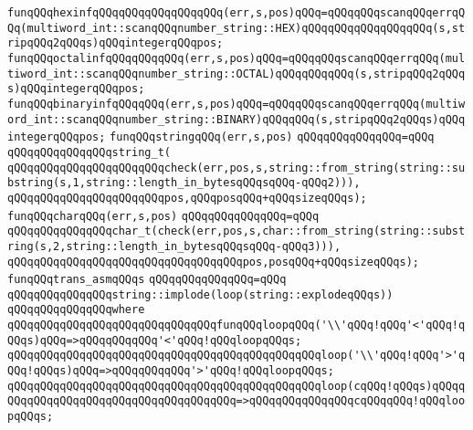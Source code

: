 \verb|funqQQqhexinfqQQqqQQqqQQqqQQqqQQq(err,s,pos)qQQq=qQQqqQQqscanqQQqerrqQQq(multiword_int::scanqQQqnumber_string::HEX)qQQqqQQqqQQqqQQqqQQq(s,stripqQQq2qQQqs)qQQqintegerqQQqpos;|\newline
\verb|funqQQqoctalinfqQQqqQQqqQQq(err,s,pos)qQQq=qQQqqQQqscanqQQqerrqQQq(multiword_int::scanqQQqnumber_string::OCTAL)qQQqqQQqqQQq(s,stripqQQq2qQQqs)qQQqintegerqQQqpos;|\newline
\verb|funqQQqbinaryinfqQQqqQQq(err,s,pos)qQQq=qQQqqQQqscanqQQqerrqQQq(multiword_int::scanqQQqnumber_string::BINARY)qQQqqQQq(s,stripqQQq2qQQqs)qQQqintegerqQQqpos;|\newline
\newline
\verb|funqQQqstringqQQq(err,s,pos)|\newline
\verb|qQQqqQQqqQQqqQQq=qQQq|\newline
\verb|qQQqqQQqqQQqqQQqstring_t(|\newline
\verb|qQQqqQQqqQQqqQQqqQQqqQQqcheck(err,pos,s,string::from_string(string::substring(s,1,string::length_in_bytesqQQqsqQQq-qQQq2))),|\newline
\verb|qQQqqQQqqQQqqQQqqQQqqQQqpos,qQQqposqQQq+qQQqsizeqQQqs);|\newline
\newline
\verb|funqQQqcharqQQq(err,s,pos)|\newline
\verb|qQQqqQQqqQQqqQQq=qQQq|\newline
\verb|qQQqqQQqqQQqqQQqchar_t(check(err,pos,s,char::from_string(string::substring(s,2,string::length_in_bytesqQQqsqQQq-qQQq3))),|\newline
\verb|qQQqqQQqqQQqqQQqqQQqqQQqqQQqqQQqqQQqpos,posqQQq+qQQqsizeqQQqs);|\newline
\newline
\verb|funqQQqtrans_asmqQQqs|\newline
\verb|qQQqqQQqqQQqqQQq=qQQq|\newline
\verb|qQQqqQQqqQQqqQQqstring::implode(loop(string::explodeqQQqs))|\newline
\verb|qQQqqQQqqQQqqQQqwhere|\newline
\verb|qQQqqQQqqQQqqQQqqQQqqQQqqQQqqQQqfunqQQqloopqQQq('\\'qQQq!qQQq'<'qQQq!qQQqs)qQQq=>qQQqqQQqqQQq'<'qQQq!qQQqloopqQQqs;|\newline
\verb|qQQqqQQqqQQqqQQqqQQqqQQqqQQqqQQqqQQqqQQqqQQqqQQqloop('\\'qQQq!qQQq'>'qQQq!qQQqs)qQQq=>qQQqqQQqqQQq'>'qQQq!qQQqloopqQQqs;|\newline
\verb|qQQqqQQqqQQqqQQqqQQqqQQqqQQqqQQqqQQqqQQqqQQqqQQqloop(cqQQq!qQQqs)qQQqqQQqqQQqqQQqqQQqqQQqqQQqqQQqqQQqqQQq=>qQQqqQQqqQQqqQQqcqQQqqQQq!qQQqloopqQQqs;|\newline
